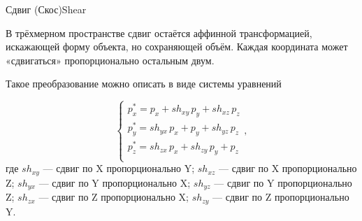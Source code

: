 \documentclass{beamer}
\begin{document}
	\begin{frame}{Сдвиг (Скос)}{Shear}

		В трёхмерном пространстве сдвиг остаётся аффинной трансформацией, искажающей форму объекта, но сохраняющей объём. 
		Каждая координата может «сдвигаться» пропорционально остальным двум. 

		Такое преобразование можно описать в виде системы уравнений
		
		\[
			\begin{cases}
				p_x^{*} = p_x + sh_{xy}\,p_y + sh_{xz}\,p_z \\
				p_y^{*} = sh_{yx}\,p_x + p_y + sh_{yz}\,p_z \\
				p_z^{*} = sh_{zx}\,p_x + sh_{zy}\,p_y + p_z \\
			\end{cases},
		\]
		где
		$sh_{xy}$ --- сдвиг по X пропорционально Y;
		$sh_{xz}$ --- сдвиг по X пропорционально Z;
		$sh_{yx}$ --- сдвиг по Y пропорционально X;
		$sh_{yz}$ --- сдвиг по Y пропорционально Z;
		$sh_{zx}$ --- сдвиг по Z пропорционально X;
		$sh_{zy}$ --- сдвиг по Z пропорционально Y.
			
	\end{frame}
\end{document}
